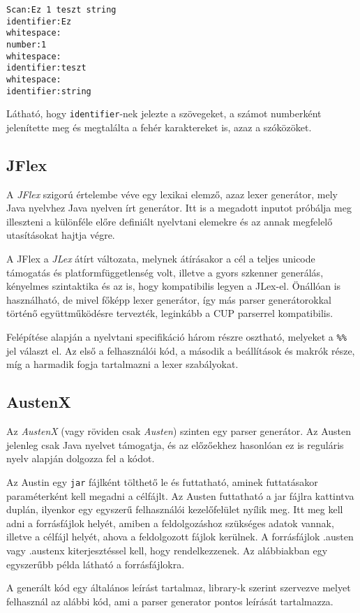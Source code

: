 \begin{verbatim}
Scan:Ez 1 teszt string
identifier:Ez
whitespace: 
number:1
whitespace: 
identifier:teszt
whitespace: 
identifier:string
\end{verbatim}

Látható, hogy \texttt{identifier}-nek jelezte a szövegeket, a számot numberként jelenítette meg és megtalálta a fehér karaktereket is, azaz a szóközöket.

\subsection{JFlex}

A \textit{JFlex} szigorú értelembe véve egy lexikai elemző, azaz lexer generátor, mely Java nyelvhez Java nyelven írt generátor. Itt is a megadott inputot próbálja meg illeszteni a különféle előre definiált nyelvtani elemekre és az annak megfelelő utasításokat hajtja végre.

A JFlex a \textit{JLex} átírt változata, melynek átírásakor a cél a teljes unicode támogatás és platformfüggetlenség volt, illetve a gyors szkenner generálás, kényelmes szintaktika és az is, hogy kompatibilis legyen a JLex-el. Önállóan is használható, de mivel főképp lexer generátor, így más parser generátorokkal történő együttműködésre tervezték, leginkább a CUP parserrel kompatibilis.

Felépítése alapján a nyelvtani specifikáció három részre osztható, melyeket a \texttt{\%\%} jel választ el. Az első a felhasználói kód, a második a beállítások és makrók része, míg a harmadik fogja tartalmazni a lexer szabályokat.


\subsection{AustenX}

Az \textit{AustenX} (vagy röviden csak \textit{Austen}) szinten egy parser generátor. Az Austen jelenleg csak Java nyelvet támogatja, és az előzőekhez hasonlóan ez is reguláris nyelv alapján dolgozza fel a kódot.

Az Austin egy \texttt{jar} fájlként tölthető le és futtatható, aminek futtatásakor paraméterként kell megadni a célfájlt. Az Austen futtatható a jar fájlra kattintva duplán, ilyenkor egy egyszerű felhasználói kezelőfelület nyílik meg. Itt meg kell adni a forrásfájlok helyét, amiben a feldolgozáshoz szükséges adatok vannak, illetve a célfájl helyét, ahova a feldolgozott fájlok kerülnek. A forrásfájlok .austen vagy .austenx kiterjesztéssel kell, hogy rendelkezzenek. Az alábbiakban egy egyszerűbb példa látható a forrásfájlokra.


A generált kód egy általános leírást tartalmaz, library-k szerint szervezve melyet felhasznál az alábbi kód, ami a parser generator pontos leírását tartalmazza.
